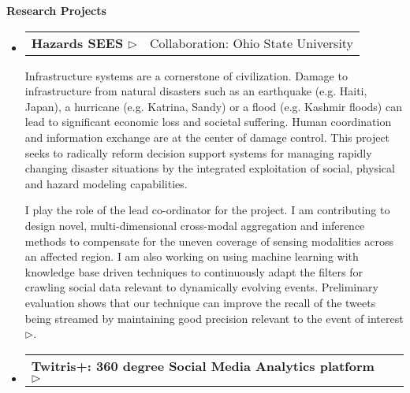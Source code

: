 \documentclass[letterpaper,9pt]{article}
\makeatletter
\newcommand{\resheading}[1]{{\large \colorbox{mygrey}{\begin{minipage}{\textwidth}{\textbf{#1 \vphantom{p\^{E}}}}\end{minipage}}}}
\newcommand{\resprojectheading}[2]{
\begin{tabular*}{7.0in}{l@{\extracolsep{\fill}}r}
		\textbf{#1} & #2\\
\end{tabular*}\vspace{-6pt}}
\makeatother
\begin{document}
\resheading{Research Projects}
\begin{itemize}
\item
\resprojectheading{Hazards SEES \href{http://wiki.knoesis.org/index.php/Social_and_Physical_Sensing_Enabled_Decision_Support}{$\triangleright$}}{Collaboration: Ohio State University}
	\vspace{0.1in}

\justify	
\hspace{1em} Infrastructure systems are a cornerstone of civilization. Damage to infrastructure from natural disasters such as an earthquake (e.g. Haiti, Japan), a hurricane (e.g. Katrina, Sandy) or a flood (e.g. Kashmir floods) can lead to significant economic loss and societal suffering. Human coordination and information exchange are at the center of damage control. This project seeks to radically reform decision support systems for managing rapidly changing disaster situations by the integrated exploitation of social, physical and hazard modeling capabilities. 

\justify
\hspace{1em} I play the role of the lead co-ordinator for the project. I am contributing to design novel, multi-dimensional cross-modal aggregation and inference methods to compensate for the uneven coverage of sensing modalities across an affected region. 
I am also working on using  machine learning with knowledge base driven techniques to continuously adapt the filters for crawling social data relevant to dynamically evolving events. Preliminary evaluation shows that our technique can improve the recall of the tweets being streamed by maintaining good precision relevant to the event of interest \href{http://wiki.knoesis.org/index.php/Continuous_Semantic_Crawling_Events}{$\triangleright$}.  

\item
\resprojectheading{Twitris+: 360 degree Social Media Analytics platform \href{http://twitris.knoesis.org/}{$\triangleright$}}{}
	\vspace{0.1in}


\end{itemize}
\end{document}
